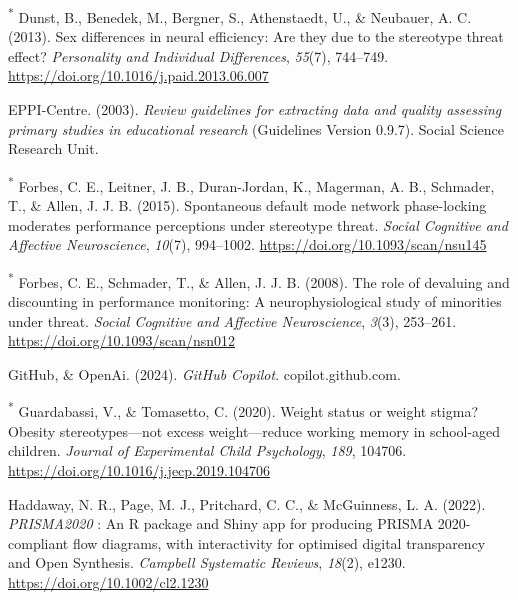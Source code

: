 \documentclass[
  stu,floatsintext]{apa7}
\newlength{\cslhangindent}
\newenvironment{CSLReferences}[2] %
 {\begin{list}{}{%
  \setlength{\itemindent}{0pt}
  \setlength{\leftmargin}{0pt}
  \setlength{\parsep}{0pt}
  \ifodd #1
   \setlength{\leftmargin}{\cslhangindent}
   \setlength{\itemindent}{-1\cslhangindent}
  \fi
  \setlength{\itemsep}{#2\baselineskip}}}
 {\end{list}}
\begin{document}
\begin{CSLReferences}{1}{0}
\textsuperscript{*} Dunst, B., Benedek, M., Bergner, S., Athenstaedt, U., \& Neubauer, A. C. (2013). Sex differences in neural efficiency: {Are} they due to the stereotype threat effect? \emph{Personality and Individual Differences}, \emph{55}(7), 744--749. \url{https://doi.org/10.1016/j.paid.2013.06.007}

EPPI-Centre. (2003). \emph{Review guidelines for extracting data and quality assessing primary studies in educational research} (Guidelines Version 0.9.7). Social Science Research Unit.

\textsuperscript{*} Forbes, C. E., Leitner, J. B., Duran-Jordan, K., Magerman, A. B., Schmader, T., \& Allen, J. J. B. (2015). Spontaneous default mode network phase-locking moderates performance perceptions under stereotype threat. \emph{Social Cognitive and Affective Neuroscience}, \emph{10}(7), 994--1002. \url{https://doi.org/10.1093/scan/nsu145}

\textsuperscript{*} Forbes, C. E., Schmader, T., \& Allen, J. J. B. (2008). The role of devaluing and discounting in performance monitoring: A neurophysiological study of minorities under threat. \emph{Social Cognitive and Affective Neuroscience}, \emph{3}(3), 253--261. \url{https://doi.org/10.1093/scan/nsn012}

GitHub, \& OpenAi. (2024). \emph{{GitHub Copilot}}. copilot.github.com.

\textsuperscript{*} Guardabassi, V., \& Tomasetto, C. (2020). Weight status or weight stigma? {Obesity} stereotypes---not excess weight---reduce working memory in school-aged children. \emph{Journal of Experimental Child Psychology}, \emph{189}, 104706. \url{https://doi.org/10.1016/j.jecp.2019.104706}

Haddaway, N. R., Page, M. J., Pritchard, C. C., \& McGuinness, L. A. (2022). {\emph{PRISMA2020}} : {An R} package and {Shiny} app for producing {PRISMA} 2020-compliant flow diagrams, with interactivity for optimised digital transparency and {Open Synthesis}. \emph{Campbell Systematic Reviews}, \emph{18}(2), e1230. \url{https://doi.org/10.1002/cl2.1230}


\end{CSLReferences}
\end{document}
